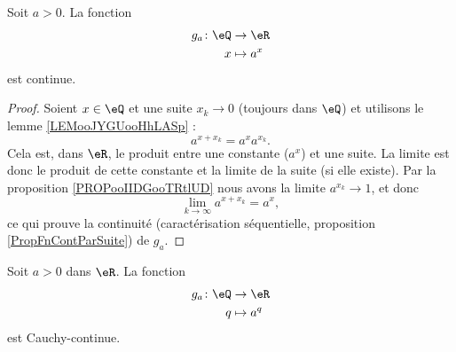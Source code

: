 \begin{lemma}       \label{LEMooKDBPooLQwxMD}
    Soit \( a>0\). La fonction
    \begin{equation}
        \begin{aligned}
            g_a\colon \eQ&\to \eR \\
            x&\mapsto a^x 
        \end{aligned}
    \end{equation}
    est continue.
\end{lemma}

\begin{proof}
    Soient \( x\in \eQ\) et une suite \( x_k\to 0\) (toujours dans \( \eQ\)) et utilisons le lemme \ref{LEMooJYGUooHhLASp} :
    \begin{equation}
        a^{x+x_k}=a^xa^{x_k}.
    \end{equation}
    Cela est, dans \( \eR\), le produit entre une constante (\( a^x\)) et une suite. La limite est donc le produit de cette constante et la limite de la suite (si elle existe). Par la proposition \ref{PROPooIIDGooTRtlUD} nous avons la limite \( a^{x_k}\to 1\), et donc
    \begin{equation}
        \lim_{k\to \infty} a^{x+x_k}=a^x,
    \end{equation}
    ce qui prouve la continuité (caractérisation séquentielle, proposition \ref{PropFnContParSuite}) de \( g_a\).
\end{proof}

\begin{proposition}     \label{PROPooQRFSooVzYdJM}
    Soit \( a>0\) dans \( \eR\). La fonction
    \begin{equation}
        \begin{aligned}
            g_a\colon \eQ&\to \eR \\
            q&\mapsto a^q 
        \end{aligned}
    \end{equation}
    est Cauchy-continue.
\end{proposition}

